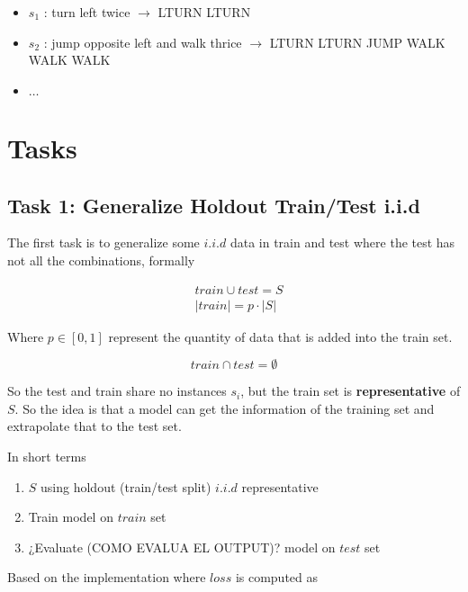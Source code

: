\documentclass[]{article}
\begin{document}
\begin{itemize}
    \item $s_1$ : \textnormal{turn left twice} $\rightarrow$ LTURN LTURN
    \item $s_2$ : \textnormal{jump opposite left and walk thrice} $\rightarrow$ LTURN LTURN JUMP WALK WALK WALK
    \item $\dots$
\end{itemize}

\section{Tasks}

\subsection{Task 1: Generalize Holdout Train/Test i.i.d}
The first task is to generalize some $i.i.d$ data in train and test where the test has not all the combinations, formally

\begin{equation}
    \begin{aligned}
         & train \cup test = S   \\
         & |train| = p \cdot |S|
    \end{aligned}
\end{equation}

Where $p \in [0, 1]$ represent the quantity of data that is added into the train set.

\begin{equation}
    train \cap test = \emptyset
\end{equation}

So the test and train share no instances $s_i$, but the train set is \textbf{representative} of $S$. So the idea is that a model can get the information of the training set and extrapolate that to the test set.

In short terms

\begin{enumerate}
    \item $S$ using holdout (train/test split) $i.i.d$ representative
    \item Train model on $train$ set
    \item ¿Evaluate (COMO EVALUA EL OUTPUT)? model on $test$ set
\end{enumerate}

Based on the implementation where $loss$ is computed as
\end{document}
